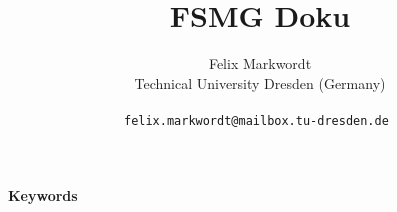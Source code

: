 \documentclass[a4paper]{article} %
\date{} %
\def\keywords#1{\begin{center}{\bf Keywords}\\{#1}\end{center}} %
\begin{document}
\title{FSMG Doku}

\author{Felix Markwordt \\ %
       Technical University Dresden (Germany) \\ \\ %
       \tt{felix.markwordt@mailbox.tu-dresden.de} %
       }%


\maketitle

\thispagestyle{empty}




\begin{abstract}


\end{abstract}



\keywords{ } %





\end{document}
